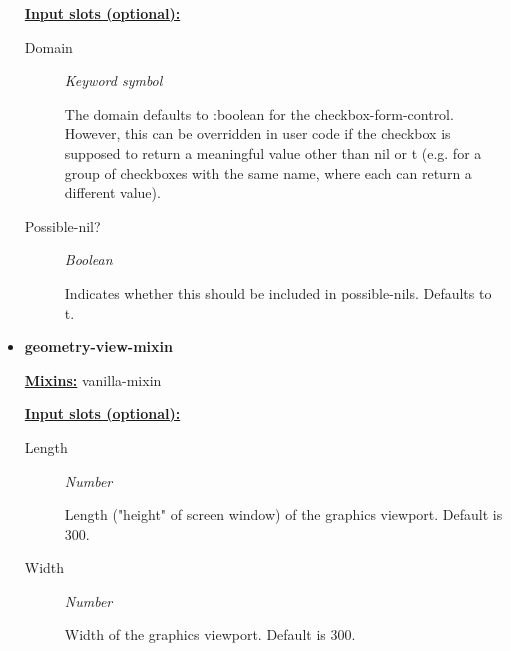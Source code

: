 \documentclass [11pt]{book}
\begin{document}
\begin{itemize}
\textbf{
\underline{Input slots (optional):}}

\begin{description}

\item [Domain]
\emph{Keyword symbol}

 The domain defaults to :boolean for the checkbox-form-control.
However, this can be overridden in user code if the checkbox is supposed to return
a meaningful value other than nil or t (e.g. for a group of checkboxes with
the same name, where each can return a different value).




\item [Possible-nil?]
\emph{Boolean}

 Indicates whether this should be included in possible-nils. Defaults to t.




\end{description}







\item {}
\label{prim:geometry-view-mixin}
\textbf{geometry-view-mixin}


\textbf{
\underline{Mixins:}} vanilla-mixin





\begin{description}

\end{description}








\textbf{
\underline{Input slots (optional):}}

\begin{description}

\item [Length]
\emph{Number}

 Length ("height" of screen window) of the graphics viewport. Default is 300.




\item [Width]
\emph{Number}

 Width of the graphics viewport. Default is 300.





\end{description}
\end{itemize}
\end{document}
